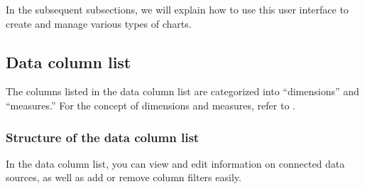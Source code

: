 \documentclass[letterpaper,10pt,english]{sphinxmanual}
\begin{document}
In the subsequent subsections, we will explain how to use this user interface to create and manage various types of charts.


\subsection{Data column list}
\label{\detokenize{discovery/part04/composition_of_the_data_column_list:id1}}\label{\detokenize{discovery/part04/composition_of_the_data_column_list::doc}}
The columns listed in the data column list are categorized into “dimensions” and “measures.” For the concept of dimensions and measures, refer to {\hyperref[\detokenize{discovery/part02/dimension_and_measures::doc}]{}}.


\subsubsection{Structure of the data column list}
\label{\detokenize{discovery/part04/composition_of_the_data_column_list:id2}}
In the data column list, you can view and edit information on connected data sources, as well as add or remove column filters easily.
\end{document}
